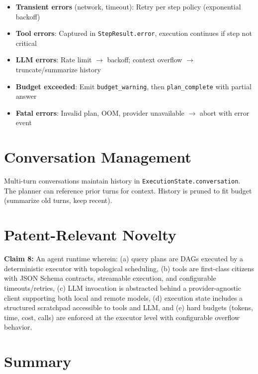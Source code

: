 \begin{itemize}
  \item \textbf{Transient errors} (network, timeout): Retry per step policy (exponential backoff)
  \item \textbf{Tool errors}: Captured in \texttt{StepResult.error}, execution continues if step not critical
  \item \textbf{LLM errors}: Rate limit $\to$ backoff; context overflow $\to$ truncate/summarize history
  \item \textbf{Budget exceeded}: Emit \texttt{budget\_warning}, then \texttt{plan\_complete} with partial answer
  \item \textbf{Fatal errors}: Invalid plan, OOM, provider unavailable $\to$ abort with error event
\end{itemize}

\section{Conversation Management}
\label{sec:runtime:conversation}

Multi-turn conversations maintain history in \texttt{ExecutionState.conversation}. The planner can reference prior turns for context. History is pruned to fit budget (summarize old turns, keep recent).

\section{Patent-Relevant Novelty}
\label{sec:runtime:patent}

\begin{patentclaim}
\textbf{Claim 8:} An agent runtime wherein: (a) query plans are DAGs executed by a deterministic executor with topological scheduling, (b) tools are first-class citizens with JSON Schema contracts, streamable execution, and configurable timeouts/retries, (c) LLM invocation is abstracted behind a provider-agnostic client supporting both local and remote models, (d) execution state includes a structured scratchpad accessible to tools and LLM, and (e) hard budgets (tokens, time, cost, calls) are enforced at the executor level with configurable overflow behavior.
\end{patentclaim}

\section{Summary}
\label{sec:runtime:summary}

